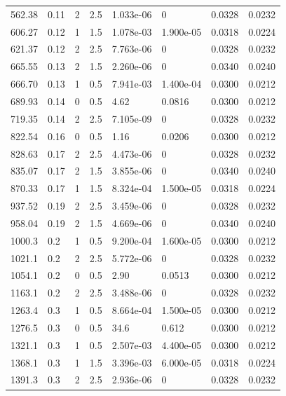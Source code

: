 \documentclass[preview]{standalone}
\begin{document}
{{\begin{tabular}{L{1.2cm}C{1.2cm} C{0.3cm}C{0.5cm} C{1.4cm}C{1.4cm} C{1.4cm}C{1.4cm}}
  562.38  &  0.11  & 2     & 2.5 &  1.033e-06  & 0  & 0.0328 &  0.0232   \\ 
  606.27  &  0.12  & 1     & 1.5 &  1.078e-03  & 1.900e-05  & 0.0318 &  0.0224   \\ 
  621.37  &  0.12  & 2     & 2.5 &  7.763e-06  & 0  & 0.0328 &  0.0232   \\ 
  665.55  &  0.13  & 2     & 1.5 &  2.260e-06  & 0  & 0.0340 &  0.0240   \\ 
  666.70  &  0.13  & 1     & 0.5 &  7.941e-03  & 1.400e-04  & 0.0300 &  0.0212   \\ 
  689.93  &  0.14  & 0     & 0.5 &  4.62  & 0.0816  & 0.0300 &  0.0212   \\ 
  719.35  &  0.14  & 2     & 2.5 &  7.105e-09  & 0  & 0.0328 &  0.0232   \\ 
  822.54  &  0.16  & 0     & 0.5 &  1.16  & 0.0206  & 0.0300 &  0.0212   \\ 
  828.63  &  0.17  & 2     & 2.5 &  4.473e-06  & 0  & 0.0328 &  0.0232   \\ 
  835.07  &  0.17  & 2     & 1.5 &  3.855e-06  & 0  & 0.0340 &  0.0240   \\ 
  870.33  &  0.17  & 1     & 1.5 &  8.324e-04  & 1.500e-05  & 0.0318 &  0.0224   \\ 
  937.52  &  0.19  & 2     & 2.5 &  3.459e-06  & 0  & 0.0328 &  0.0232   \\ 
  958.04  &  0.19  & 2     & 1.5 &  4.669e-06  & 0  & 0.0340 &  0.0240   \\ 
  1000.3  &   0.2  & 1     & 0.5 &  9.200e-04  & 1.600e-05  & 0.0300 &  0.0212   \\ 
  1021.1  &   0.2  & 2     & 2.5 &  5.772e-06  & 0  & 0.0328 &  0.0232   \\ 
  1054.1  &   0.2  & 0     & 0.5 &  2.90  & 0.0513  & 0.0300 &  0.0212   \\ 
  1163.1  &   0.2  & 2     & 2.5 &  3.488e-06  & 0  & 0.0328 &  0.0232   \\ 
  1263.4  &   0.3  & 1     & 0.5 &  8.664e-04  & 1.500e-05  & 0.0300 &  0.0212   \\ 
  1276.5  &   0.3  & 0     & 0.5 &  34.6  & 0.612  & 0.0300 &  0.0212   \\ 
  1321.1  &   0.3  & 1     & 0.5 &  2.507e-03  & 4.400e-05  & 0.0300 &  0.0212   \\ 
  1368.1  &   0.3  & 1     & 1.5 &  3.396e-03  & 6.000e-05  & 0.0318 &  0.0224   \\ 
  1391.3  &   0.3  & 2     & 2.5 &  2.936e-06  & 0  & 0.0328 &  0.0232   \\ 

\end{tabular}}}
\end{document}
